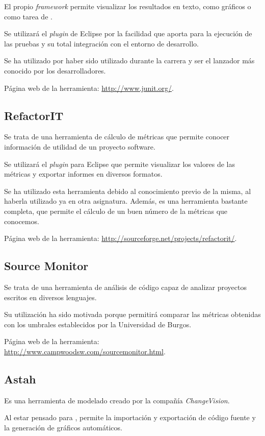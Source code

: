 El propio \textit{framework} permite visualizar los resultados en texto, como gráficos o como tarea de \ant{}.

Se utilizará el \textit{plugin} de Eclipse por la facilidad que aporta para la ejecución de las pruebas y su total integración con el entorno de desarrollo.

Se ha utilizado por haber sido utilizado durante la carrera y ser el lanzador más conocido por los desarrolladores.

Página web de la herramienta: \url{http://www.junit.org/}.


\subsection{RefactorIT}
Se trata de una herramienta de cálculo de  métricas que permite conocer información de utilidad de un proyecto software.

Se utilizará el \textit{plugin} para Eclipse que permite visualizar los valores de las métricas y exportar informes en diversos formatos.

Se ha utilizado esta herramienta debido al conocimiento previo de la misma, al haberla utilizado ya en otra asignatura. Además, es una herramienta bastante completa, que permite el cálculo de un buen número de la métricas que conocemos.

Página web de la herramienta: \url{http://sourceforge.net/projects/refactorit/}.


\subsection{Source Monitor}
Se trata de una herramienta de análisis de código capaz de analizar proyectos escritos en diversos lenguajes.

Su utilización ha sido motivada porque permitirá comparar las métricas obtenidas con los umbrales establecidos por la Universidad de Burgos.

Página web de la herramienta: \url{http://www.campwoodsw.com/sourcemonitor.html}.


\subsection{Astah}
Es una herramienta de modelado \uml{} creado por la compañía \textit{ChangeVision}.

Al estar pensado para \java{}, permite la importación y exportación de código fuente y la generación de gráficos automáticos.

